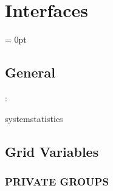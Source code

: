 
\section{Interfaces} 


\parskip = 0pt

\vspace{3mm} \subsection*{General}

: 

systemstatistics
\vspace{2mm}
\subsection*{Grid Variables}
\vspace{5mm}\subsubsection{PRIVATE GROUPS}

\vspace{5mm}

